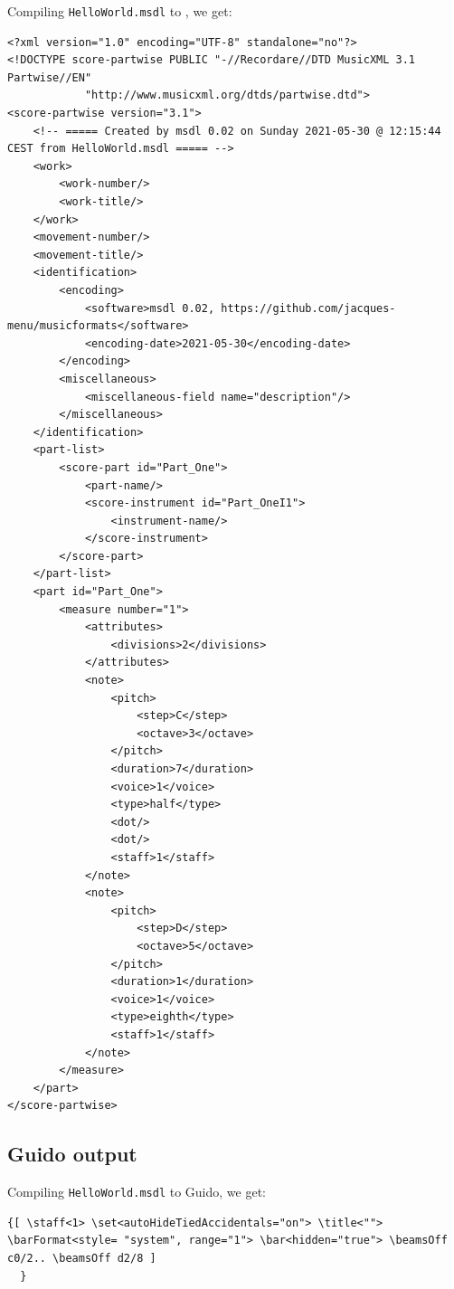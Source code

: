 Compiling {\tt HelloWorld.msdl} to \mxml, we get:
\begin{lstlisting}[language=MusicXML]
<?xml version="1.0" encoding="UTF-8" standalone="no"?>
<!DOCTYPE score-partwise PUBLIC "-//Recordare//DTD MusicXML 3.1 Partwise//EN"
			"http://www.musicxml.org/dtds/partwise.dtd">
<score-partwise version="3.1">
    <!-- ===== Created by msdl 0.02 on Sunday 2021-05-30 @ 12:15:44 CEST from HelloWorld.msdl ===== -->
    <work>
        <work-number/>
        <work-title/>
    </work>
    <movement-number/>
    <movement-title/>
    <identification>
        <encoding>
            <software>msdl 0.02, https://github.com/jacques-menu/musicformats</software>
            <encoding-date>2021-05-30</encoding-date>
        </encoding>
        <miscellaneous>
            <miscellaneous-field name="description"/>
        </miscellaneous>
    </identification>
    <part-list>
        <score-part id="Part_One">
            <part-name/>
            <score-instrument id="Part_OneI1">
                <instrument-name/>
            </score-instrument>
        </score-part>
    </part-list>
    <part id="Part_One">
        <measure number="1">
            <attributes>
                <divisions>2</divisions>
            </attributes>
            <note>
                <pitch>
                    <step>C</step>
                    <octave>3</octave>
                </pitch>
                <duration>7</duration>
                <voice>1</voice>
                <type>half</type>
                <dot/>
                <dot/>
                <staff>1</staff>
            </note>
            <note>
                <pitch>
                    <step>D</step>
                    <octave>5</octave>
                </pitch>
                <duration>1</duration>
                <voice>1</voice>
                <type>eighth</type>
                <staff>1</staff>
            </note>
        </measure>
    </part>
</score-partwise>
\end{lstlisting}

\subsection{Guido output}

Compiling {\tt HelloWorld.msdl} to Guido, we get:
\begin{lstlisting}[language=Guido]
{[ \staff<1> \set<autoHideTiedAccidentals="on"> \title<""> \barFormat<style= "system", range="1"> \bar<hidden="true"> \beamsOff c0/2.. \beamsOff d2/8 ]
  }
\end{lstlisting}


